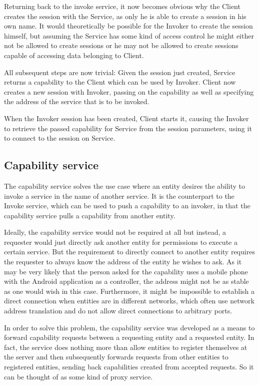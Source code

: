Returning back to the invoke service, it now becomes obvious why the Client creates the session with the Service, as only he is able to create a session in his own name.
It would theoretically be possible for the Invoker to create the session himself, but assuming the Service has some kind of access control he might either not be allowed to create sessions or he may not be allowed to create sessions capable of accessing data belonging to Client.

All subsequent steps are now trivial:
Given the session just created, Service returns a capability to the Client which can be used by Invoker.
Client now creates a new session with Invoker, passing on the capability as well as specifying the address of the service that is to be invoked.

When the Invoker session has been created, Client starts it, causing the Invoker to retrieve the passed capability for Service from the session parameters, using it to connect to the session on Service.

\subsection{Capability service}
\label{sec:capability-service}

The capability service solves the use case where an entity desires the ability to invoke a service in the name of another service.
It is the counterpart to the Invoke service, which can be used to push a capability to an invoker, in that the capability service pulls a capability from another entity.

Ideally, the capability service would not be required at all but instead, a requester would just directly ask another entity for permissions to execute a certain service.
But the requirement to directly connect to another entity requires the requester to always know the address of the entity he wishes to ask.
As it may be very likely that the person asked for the capability uses a mobile phone with the Android application as a controller, the address might not be as stable as one would wish in this case.
Furthermore, it might be impossible to establish a direct connection when entities are in different networks, which often use network address translation and do not allow direct connections to arbitrary ports.

In order to solve this problem, the capability service was developed as a means to forward capability requests between a requesting entity and a requested entity.
In fact, the service does nothing more than allow entities to register themselves at the server and then subsequently forwards requests from other entities to registered entities, sending back capabilities created from accepted requests.
So it can be thought of as some kind of proxy service.

